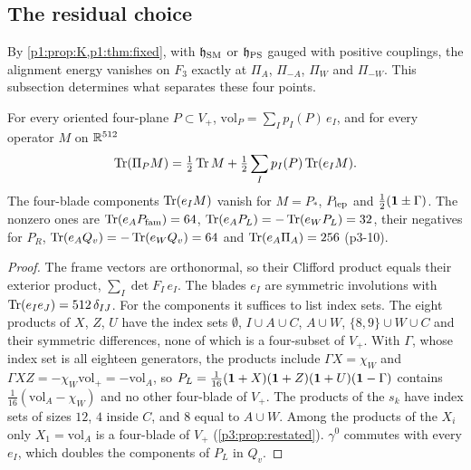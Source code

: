 \subsection{The residual choice}
\label{p3:sec:residual}

By \cref{p1:prop:K,p1:thm:fixed}, with $\mathfrak h_{\rm SM}$ or $\mathfrak h_{\rm PS}$ gauged with positive couplings, the alignment energy vanishes on $F_3$ exactly at
$\Pi_A$, $\Pi_{-A}$, $\Pi_W$ and $\Pi_{-W}$. This subsection determines what separates these four points.

\begin{lemma}
\label{p3:lem:plucker}
For every oriented four-plane $P\subset V_+$, $\mathrm{vol}_P=\sum_Ip_I(P)\,e_I$, and for every operator $M$ on $\mathbb{R}^{512}$
\[
\operatorname{Tr}(\Pi_PM)=\tfrac12\operatorname{Tr} M+\tfrac12\sum_Ip_I(P)\operatorname{Tr}(e_IM).
\]
The four-blade components $\operatorname{Tr}(e_IM)$ vanish for $M=P_*$, $P_{\rm lep}$ and $\tfrac12(\mathbf 1\pm\Gamma)$. The nonzero ones are $\operatorname{Tr}(e_AP_{\rm fam})=64$,
$\operatorname{Tr}(e_AP_L)=-\operatorname{Tr}(e_WP_L)=32$, their negatives for $P_R$, $\operatorname{Tr}(e_AQ_v)=-\operatorname{Tr}(e_WQ_v)=64$ and $\operatorname{Tr}(e_A\Pi_A)=256$ (p3-10).
\end{lemma}

\begin{proof}
The frame vectors are orthonormal, so their Clifford product equals their exterior product, $\sum_I\det F_I\,e_I$. The blades $e_I$ are symmetric involutions with
$\operatorname{Tr}(e_Ie_J)=512\,\delta_{IJ}$. For the components it suffices to list index sets. The eight products of $X$, $Z$, $U$ have the index sets $\emptyset$, $I\cup A\cup C$,
$A\cup W$, $\{8,9\}\cup W\cup C$ and their symmetric differences, none of which is a four-subset of $V_+$. With $\Gamma$, whose index set is all eighteen generators, the
products include $\Gamma X=\chi_W$ and $\Gamma XZ=-\chi_W\mathrm{vol}_+=-\mathrm{vol}_A$, so $P_L=\tfrac1{16}(\mathbf 1+X)(\mathbf 1+Z)(\mathbf 1+U)(\mathbf 1-\Gamma)$ contains
$\tfrac1{16}(\mathrm{vol}_A-\chi_W)$ and no other four-blade of $V_+$. The products of the $s_k$ have index sets of sizes $12$, $4$ inside $C$, and $8$ equal to $A\cup W$.
Among the products of the $X_i$ only $X_1=\mathrm{vol}_A$ is a four-blade of $V_+$ (\cref{p3:prop:restated}). $\gamma^0$ commutes with every $e_I$, which doubles the components
of $P_L$ in $Q_v$.
\end{proof}

